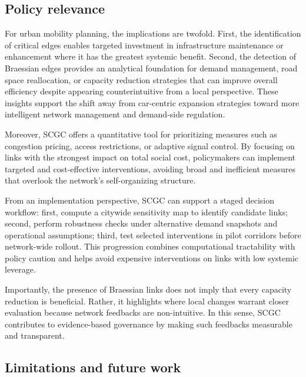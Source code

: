 \documentclass[twocolumn,english,groupedaddress, superscriptaddress,aps,pre,10pt,floatfix]{revtex4-2}
\begin{document}
\subsection{Policy relevance}

For urban mobility planning, the implications are twofold. First, the identification of critical edges enables targeted investment in infrastructure maintenance or enhancement where it has the greatest systemic benefit. Second, the detection of Braessian edges provides an analytical foundation for demand management, road space reallocation, or capacity reduction strategies that can improve overall efficiency despite appearing counterintuitive from a local perspective. These insights support the shift away from car-centric expansion strategies toward more intelligent network management and demand-side regulation.

Moreover, SCGC offers a quantitative tool for prioritizing measures such as congestion pricing, access restrictions, or adaptive signal control. By focusing on links with the strongest impact on total social cost, policymakers can implement targeted and cost-effective interventions, avoiding broad and inefficient measures that overlook the network’s self-organizing structure.

From an implementation perspective, SCGC can support a staged decision workflow: first, compute a citywide sensitivity map to identify candidate links; second, perform robustness checks under alternative demand snapshots and operational assumptions; third, test selected interventions in pilot corridors before network-wide rollout. This progression combines computational tractability with policy caution and helps avoid expensive interventions on links with low systemic leverage.

Importantly, the presence of Braessian links does not imply that every capacity reduction is beneficial. Rather, it highlights where local changes warrant closer evaluation because network feedbacks are non-intuitive. In this sense, SCGC contributes to evidence-based governance by making such feedbacks measurable and transparent.

\subsection{Limitations and future work}
\end{document}
